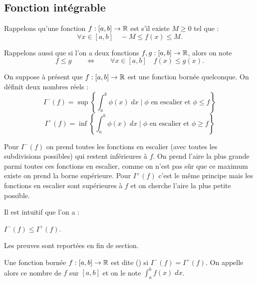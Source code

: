 \documentclass[class=report,crop=false]{standalone}
\begin{document}
\subsection{Fonction intégrable}
\label{ssec:int12}

Rappelons qu'une fonction $f : [a,b] \to \mathbb{R}$ est  s'il existe $M\ge0$ tel que :
$$\forall x \in [a,b] \quad -M \le f(x) \le M.$$

Rappelons aussi que si l'on a deux fonctions $f,g : [a,b] \to \mathbb{R}$, alors on note
$$f \le g  \qquad \iff \qquad \forall x \in [a,b] \quad f(x) \le g(x).$$

\bigskip

On suppose à présent que $f : [a,b] \to \mathbb{R}$ est une fonction bornée quelconque. On définit deux nombres réels :
$$I^-(f) = \sup \left\{ \int_a^b \phi(x) \; dx \mid \phi \text{ en escalier et } \phi \le f \right\}$$
$$I^+(f) = \inf \left\{ \int_a^b \phi(x) \; dx \mid \phi \text{ en escalier et } \phi \ge f \right\}$$



Pour $I^-(f)$ on prend toutes les fonctions en escalier (avec toutes les subdivisions possibles)
qui restent inférieures à $f$. On prend l'aire la plus grande parmi toutes ces fonctions en escalier,
comme on n'est pas sûr que ce maximum existe on prend la borne supérieure.
Pour $I^+(f)$ c'est le même principe mais les fonctions en escalier sont supérieures à $f$
et on cherche l'aire la plus petite possible.

Il est intuitif que l'on a :
\begin{proposition}
\label{prop:ImoinsIplus}
$I^-(f) \le I^+(f)$.
\end{proposition}
Les preuves sont reportées en fin de section.

\begin{definition}
Une fonction bornée $f :[a,b] \to \mathbb{R}$ est dite  ()
si $I^-(f) = I^+(f)$. On appelle alors ce nombre 
 de $f$ sur $[a,b]$ et on le note
$\int_a^b f(x)\; dx$.
\end{definition}
\end{document}
